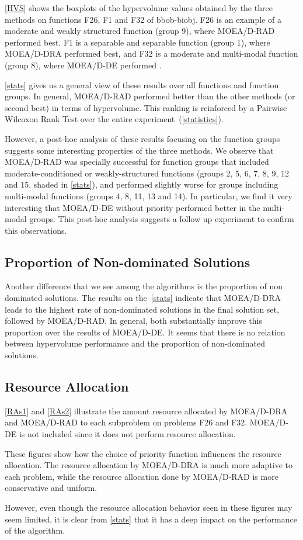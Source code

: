 \ref{HVS} shows the boxplots of the hypervolume values obtained by the three methods
on functions F26, F1 and F32 of bbob-biobj. F26 is an example of a moderate and
weakly structured function (group 9), where MOEA/D-RAD performed best. F1  is a
separable and separable function (group 1), where MOEA/D-DRA performed best, and
F32 is a moderate and multi-modal function (group 8), where MOEA/D-DE performed
.

\ref{stats} gives us a general view of these results over all functions and
function groups. In general, MOEA/D-RAD performed better than the other methods
(or second best) in terms of hypervolume. This ranking is reinforced by a
Pairwise Wilcoxon Rank Test over the entire experiment~(\ref{statistics}).

However, a post-hoc analysis of these results focusing on the function groups
suggests some interesting properties of the three methods. We observe that
MOEA/D-RAD was specially successful for function groups that included
moderate-conditioned or weakly-structured functions (groups 2, 5, 6, 7, 8, 9, 12 and
15, shaded in \ref{stats}), and performed slightly worse for groups including
multi-modal functions (groups 4, 8, 11, 13 and 14). In particular, we find it  very
interesting that MOEA/D-DE without priority performed better in the multi-modal
groups. This post-hoc analysis suggests a follow up experiment to confirm this
observations.

\subsection{Proportion of Non-dominated Solutions}

Another difference that we see among the algorithms  is the proportion of non
dominated solutions. The results on the~\ref{stats} indicate that MOEA/D-DRA
leads to the highest rate of non-dominated solutions in the final solution set,
followed by MOEA/D-RAD. In general, both substantially improve this proportion
over the results of MOEA/D-DE.  It seems that there is no relation between
hypervolume performance and the proportion of non-dominated solutions.


\subsection{Resource Allocation}


\ref{RAs1} and \ref{RAs2} illustrate the amount resource allocated by MOEA/D-DRA
and MOEA/D-RAD to each subproblem on problems F26 and F32. MOEA/D-DE is
not included since it does not perform resource allocation.

These figures show how the choice of priority function influences the
resource allocation. The resource allocation by MOEA/D-DRA is much more
adaptive to each problem, while the resource allocation done by
MOEA/D-RAD is more conservative and uniform.

However, even though the resource allocation behavior seen in these figures
may seem limited, it is clear from \ref{stats} that it has a deep impact on
the performance of the algorithm.


